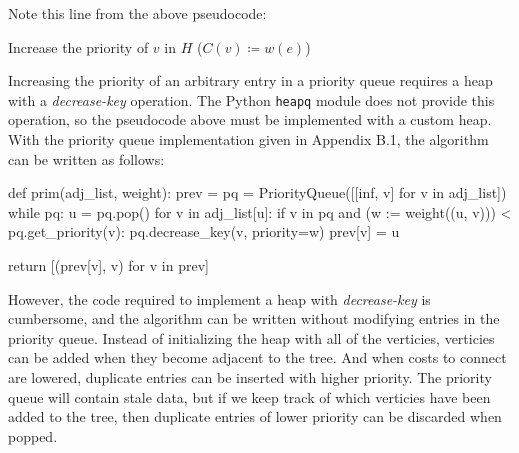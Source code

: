 \documentclass[12pt, titlepage]{article}
\begin{document}
Note this line from the above pseudocode:
\begin{center}
Increase the priority of $v$ in $H$\hspace{4mm} ($C(v)\coloneqq w(e)$)
\end{center}
Increasing the priority of an arbitrary entry in a priority queue requires a heap with a \textit{decrease-key} operation. The Python \texttt{heapq} module does not provide this operation, so the pseudocode above must be implemented with a custom heap. With the priority queue implementation given in Appendix B.1, the algorithm can be written as follows: \medskip

\begin{python}
def prim(adj_list, weight):
    prev = {}
    pq = PriorityQueue([[inf, v] for v in adj_list])
    while pq:
        u = pq.pop()
        for v in adj_list[u]:
            if v in pq and (w := weight((u, v))) < pq.get_priority(v):
                pq.decrease_key(v, priority=w)
                prev[v] = u

    return [(prev[v], v) for v in prev]
\end{python}

However, the code required to implement a heap with \textit{decrease-key} is cumbersome, and the algorithm can be written without modifying entries in the priority queue. Instead of initializing the heap with all of the verticies, verticies can be added when they become adjacent to the tree. And when costs to connect are lowered, duplicate entries can be inserted with higher priority. The priority queue will contain stale data, but if we keep track of which verticies have been added to the tree, then duplicate entries of lower priority can be discarded when popped. \\
\end{document}
